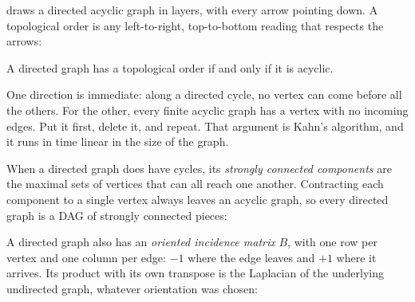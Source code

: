  draws a directed acyclic graph in layers, with every arrow
pointing down. A topological order is any left-to-right, top-to-bottom reading
that respects the arrows:



\begin{theorem}
A directed graph has a topological order if and only if it is acyclic.
\end{theorem}

One direction is immediate: along a directed cycle, no vertex can come before
all the others. For the other, every finite acyclic graph has a vertex with no
incoming edges. Put it first, delete it, and repeat. That argument is Kahn's
algorithm, and it runs in time linear in the size of the graph.

When a directed graph does have cycles, its \emph{strongly connected
components} are the maximal sets of vertices
that can all reach one another. Contracting each component to a single vertex
always leaves an acyclic graph, so every directed graph is a DAG of strongly
connected pieces:

\begin{codepairs}
\end{codepairs}

A directed graph also has an \emph{oriented incidence matrix} \(B\), with one row
per vertex and one column per edge: \(-1\) where the edge leaves and \(+1\) where
it arrives. Its product with its own transpose is the Laplacian of the
underlying undirected graph, whatever orientation was chosen:

\begin{codepairs}
\end{codepairs}


